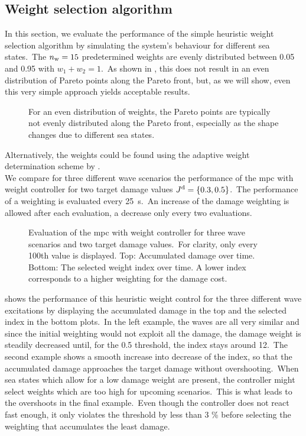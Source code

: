 \subsection{Weight selection algorithm}
In this section, we evaluate the performance of the simple heuristic weight selection algorithm by simulating the system's behaviour for different sea states.\ 
The $n_\mathrm{w}=15$ predetermined weights are evenly distributed between 0.05 and 0.95 with $w_1+w_2=1$.\ 
As shown in , this does not result in an even distribution of Pareto points along the Pareto front, but, as we will show, even this very simple approach yields acceptable results.\
\begin{figure}[htb]
	\centering
	\fontsize{8}{0}\selectfont
	\def\svgwidth{0.4\textwidth}
	
	\caption{For an even distribution of weights, the Pareto points are typically not evenly distributed along the Pareto front, especially as the shape changes due to different sea states.}
	\label{fig:PF}
\end{figure}

Alternatively, the weights could be found using the adaptive weight determination scheme by \cite{Ryu2019}.\
\\ 
We compare for three different wave scenarios the performance of the \ac{mpc} with weight controller for two target damage values $J^\mathrm{d} = \left\{0.3, 0.5\right\}$.\ 
The performance of a weighting is evaluated every \SI{25}{\second}.\ 
An increase of the damage weighting is allowed after each evaluation, a decrease only every two evaluations.
\begin{figure*}[htb]
\centering
\fontsize{8}{0}\selectfont
\def\svgwidth{0.97\textwidth}

\caption{Evaluation of the \ac{mpc} with weight controller for three wave scenarios and two target damage values.\ For clarity, only every 100th value is displayed. Top: Accumulated damage over time. Bottom: The selected weight index \iw over time. A lower index corresponds to a higher weighting for the damage cost.}
\label{fig:weight_control}
\end{figure*}

\figref{fig:weight_control} shows the performance of this heuristic weight control for the three different wave excitations by displaying the accumulated damage in the top and the selected index in the bottom plots.\ 
In the left example, the waves are all very similar and since the initial weighting would not exploit all the damage, the damage weight is steadily decreased until, for the 0.5 threshold, the index stays around 12.\
The second example shows a smooth increase into decrease of the index, so that the accumulated damage approaches the target damage without overshooting.\ 
When sea states which allow for a low damage weight are present, the controller might select weights which are too high for upcoming scenarios.\ 
This is what leads to the overshoots in the final example.\ 
Even though the controller does not react fast enough, it only violates the threshold by less than 3 \% before selecting the weighting that accumulates the least damage.

